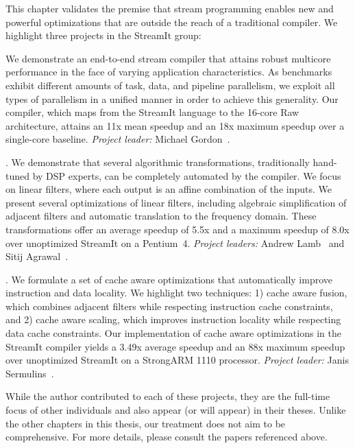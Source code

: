\label{chap:optimizing}

This chapter validates the premise that stream programming enables new
and powerful optimizations that are outside the reach of a traditional
compiler.  We highlight three projects in the StreamIt group:

\mybegin

  We demonstrate an end-to-end stream 
compiler that attains robust multicore performance in the face of
varying application characteristics.  As benchmarks exhibit different
amounts of task, data, and pipeline parallelism, we exploit all types
of parallelism in a unified manner in order to achieve this
generality.  Our compiler, which maps from the StreamIt language to
the 16-core Raw architecture, attains an 11x mean speedup and an 18x
maximum speedup over a single-core baseline.  {\it Project leader:}
Michael Gordon~\cite{gordon-asplos06}.

.  We demonstrate that 
several algorithmic transformations, traditionally hand-tuned by DSP
experts, can be completely automated by the compiler.  We focus on
linear filters, where each output is an affine combination of the
inputs.  We present several optimizations of linear filters, including
algebraic simplification of adjacent filters and automatic translation
to the frequency domain.  These transformations offer an average
speedup of 5.5x and a maximum speedup of 8.0x over unoptimized
StreamIt on a Pentium~4.  {\it Project leaders:} Andrew
Lamb~\cite{lamb-pldi03,lamb-thesis} and Sitij
Agrawal~\cite{agrawal-cases05,agrawal-thesis}.

.   We formulate a set of cache aware 
optimizations that automatically improve instruction and data
locality.  We highlight two techniques: 1) cache aware fusion, which
combines adjacent filters while respecting instruction cache
constraints, and 2) cache aware scaling, which improves instruction
locality while respecting data cache constraints.  Our implementation
of cache aware optimizations in the StreamIt compiler yields a 3.49x
average speedup and an 88x maximum speedup over unoptimized StreamIt
on a StrongARM 1110 processor.  {\it Project leader:} Janis
Sermulins~\cite{sermulins:lctes:2005,sermulins-thesis}.

\myend

While the author contributed to each of these projects, they are the
full-time focus of other individuals and also appear (or will appear)
in their theses.  Unlike the other chapters in this thesis, our
treatment does not aim to be comprehensive.  For more details, please
consult the papers referenced above.

